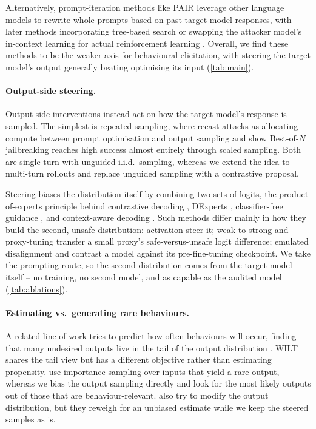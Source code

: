 \documentclass{article}
\theoremstyle{plain}
\theoremstyle{definition}
\theoremstyle{remark}
\begin{document}
Alternatively, prompt-iteration methods like PAIR \citep{chao2023jailbreaking} leverage other language models to rewrite whole prompts based on past target model responses, with later methods incorporating tree-based search \citep{mehrotra2023tap} or swapping the attacker model's in-context learning for actual reinforcement learning \citep{chowdhury2025pathological}.
Overall, we find these methods to be the weaker axis for behavioural elicitation, with steering the target model's output generally beating optimising its input (\cref{tab:main}).


\paragraph{Output-side steering.}
Output-side interventions instead act on how the target model's response is sampled.
The simplest is repeated sampling, where \citet{beyer2026sampling} recast attacks as allocating compute between prompt optimisation and output sampling and \citet{hughes2024bon} show Best-of-$N$ jailbreaking reaches high success almost entirely through scaled sampling.
Both are single-turn with unguided i.i.d.\ sampling, whereas we extend the idea to multi-turn rollouts and replace unguided sampling with a contrastive proposal.

Steering biases the distribution itself by combining two sets of logits, the product-of-experts principle \citep{hinton2002poe} behind contrastive decoding \citep{li2023contrastive}, DExperts \citep{liu2021dexperts}, classifier-free guidance \citep{ho2022cfg,sanchez2023cfg}, and context-aware decoding \citep{shi2024trusting}.
Such methods differ mainly in how they build the second, unsafe distribution: \citet{angell2026tail} activation-steer it; weak-to-strong \citep{zhao2024weak} and proxy-tuning \citep{liu2024proxy} transfer a small proxy's safe-versus-unsafe logit difference; emulated disalignment \citep{zhou2024emulated} and \citet{aranguri2025diffamp} contrast a model against its pre-fine-tuning checkpoint.
We take the prompting route, so the second distribution comes from the target model itself -- no training, no second model, and as capable as the audited model (\cref{tab:ablations}).


\paragraph{Estimating vs.\ generating rare behaviours.}
A related line of work tries to predict how often behaviours will occur, finding that many undesired outputs live in the tail of the output distribution \citep{scholten2024probabilistic,jones2025forecasting}.
WILT shares the tail view but has a different objective rather than estimating propensity.
\citet{wu2024rare} use importance sampling over inputs that yield a rare output, whereas we bias the output sampling directly and look for the most likely outputs out of those that are behaviour-relevant. \citet{angell2026tail} also try to modify the output distribution, but they reweigh for an unbiased estimate while we keep the steered samples as is.
\end{document}
